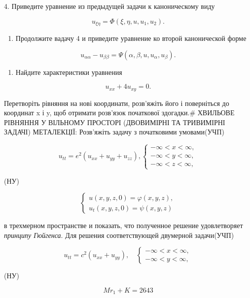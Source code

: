 \documentclass[
  ukrainian,
]{article}
\providecommand{\tightlist}{%
  \setlength{\itemsep}{0pt}\setlength{\parskip}{0pt}}
\begin{document}
\[\] 4. Приведите уравнение из предыдущей задачи к каноническому виду

\[
u_{\xi\eta} = \Phi(\xi, \eta, u, u_1, u_2).
\]

\begin{enumerate}
\def\labelenumi{\arabic{enumi}.}
\setcounter{enumi}{4}
\tightlist
\item
  Продолжите вадачу 4 и приведите уравнение ко второй канонической форме
\end{enumerate}

\[
u_{\alpha\alpha} - u_{\beta\beta} = \Psi(\alpha, \beta, u, u_{\alpha}, u_{\beta}).
\]

\begin{enumerate}
\def\labelenumi{\arabic{enumi}.}
\setcounter{enumi}{5}
\tightlist
\item
  Найдите характеристики уравнения
\end{enumerate}

\[
u_{xx} + 4u_{xy} = 0.
\]

Перетворіть рівняння на нові координати, розв'яжіть його і поверніться
до координат x і y, щоб отримати розв'язок початкової здогадки.\#
ХВИЛЬОВЕ РІВНЯННЯ У ВІЛЬНОМУ ПРОСТОРІ (ДВОВИМІРНІ ТА ТРИВИМІРНІ ЗАДАЧІ)
МЕТАЛЕКЦІЇ: Розв'яжіть задачу з початковими умовами(УЧП)

\[
u_{tt} = e^{2} (u_{xx} + u_{yy} + u_{zz}),
\begin{cases} -\infty < x < \infty, \\ -\infty < y < \infty, \\ -\infty < z < \infty, \end{cases}
\]

(НУ)

\[
\begin{cases} u(x, y, z, 0) = \varphi(x, y, z), \\ u_{t}(x, y, z, 0) = \psi(x, y, z) \end{cases}
\]

в трехмерном пространстве и показать, что полученное решение
удовлетворяет \emph{принципу Гюйгенса}. Для решения соответствующей
двумерной задачи(УЧП)

\[
u_{tt} = c^2 (u_{xx} + u_{yy}), \quad
\begin{cases} -\infty < x < \infty, \\ -\infty < y < \infty, \end{cases}
\]

(НУ)

\[
Mr_1 + K = 2643
\]
\end{document}
